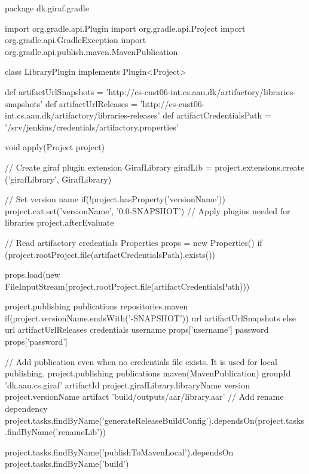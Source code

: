 \begin{gradlecode}[caption=Gradle Plugin to publish libraries (written in Groovy),label=lst:gradle_plugin_library_app,breakatwhitespace=false]
package dk.giraf.gradle

import org.gradle.api.Plugin
import org.gradle.api.Project
import org.gradle.api.GradleException
import org.gradle.api.publish.maven.MavenPublication

class LibraryPlugin implements Plugin<Project> {

  def artifactUrlSnapshots = 'http://cs-cust06-int.cs.aau.dk/artifactory/libraries-snapshots'
  def artifactUrlReleases = 'http://cs-cust06-int.cs.aau.dk/artifactory/libraries-releases'
  def artifactCredentialsPath = '/srv/jenkins/credentials/artifactory.properties'

  void apply(Project project) {
    // Create giraf plugin extension
    GirafLibrary girafLib = project.extensions.create ('girafLibrary', GirafLibrary)

    // Set version name
    if(!project.hasProperty('versionName')) {
      project.ext.set('versionName', '0.0-SNAPSHOT')
    }
    // Apply plugins needed for libraries
    project.afterEvaluate {
      // Read artifactory credentials
      Properties props = new Properties()
      if (project.rootProject.file(artifactCredentialsPath).exists()) {
        props.load(new FileInputStream(project.rootProject.file(artifactCredentialsPath)))

        project.publishing {
          publications {
            repositories.maven {
              if(project.versionName.endsWith('-SNAPSHOT')) {
                url artifactUrlSnapshots
              } else {
                url artifactUrlReleases
              }
              credentials {
                username props['username']
                password props['password']
              }
            }
          }
        }
      }
      // Add publication even when no credentials file exists. It is used for local publishing.
      project.publishing {
        publications {
          maven(MavenPublication) {
            groupId 'dk.aau.cs.giraf'
            artifactId project.girafLibrary.libraryName
            version project.versionName
            artifact 'build/outputs/aar/library.aar'
          }
        }
      }
      // Add rename dependency
      project.tasks.findByName('generateReleaseBuildConfig').dependsOn(project.tasks.findByName('renameLib'))

      project.tasks.findByName('publishToMavenLocal').dependsOn project.tasks.findByName('build')

}}}
\end{gradlecode}
